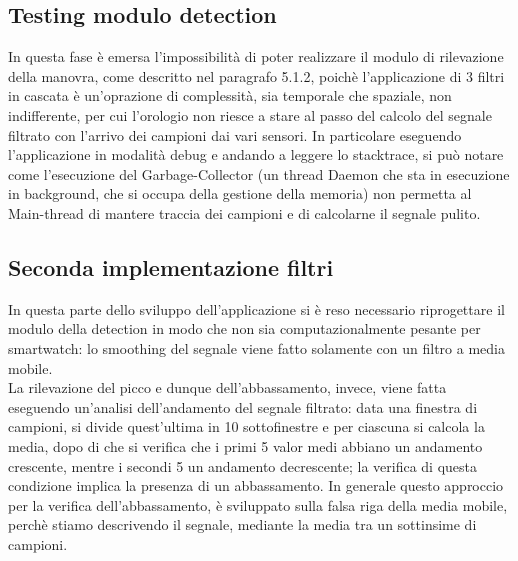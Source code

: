 \documentclass[a4paper, oneside]{book}
\begin{document}
\subsection{Testing modulo detection}
In questa fase è emersa l'impossibilità di poter realizzare il modulo di rilevazione della manovra, come descritto nel paragrafo 5.1.2, poichè l'applicazione di 3 filtri in cascata è un'oprazione di complessità, sia temporale che spaziale, non indifferente, per cui l'orologio non riesce a stare al passo del calcolo del segnale filtrato con l'arrivo dei campioni dai vari sensori. In particolare eseguendo l'applicazione in modalità debug e andando a leggere lo stacktrace, si può notare come l'esecuzione del Garbage-Collector (un thread Daemon che sta in esecuzione in background, che si occupa della gestione della memoria) non permetta al Main-thread di mantere traccia dei campioni e di calcolarne il segnale pulito.

\subsection{Seconda implementazione filtri}
In questa parte dello sviluppo dell'applicazione si è reso necessario riprogettare il modulo della detection in modo che non sia computazionalmente pesante per smartwatch: lo smoothing del segnale viene fatto solamente con un filtro a media mobile. \\
La rilevazione del picco e dunque dell'abbassamento, invece, viene fatta eseguendo un'analisi dell'andamento del segnale filtrato: data una finestra di campioni, si divide quest'ultima in 10 sottofinestre e per ciascuna si calcola la media, dopo di che si verifica che i primi 5 valor medi abbiano un andamento crescente, mentre i secondi 5 un andamento decrescente; la verifica di questa condizione implica la presenza di un abbassamento. In generale questo approccio per la verifica dell'abbassamento, è sviluppato sulla falsa riga della media mobile, perchè stiamo descrivendo il segnale, mediante la media tra un sottinsime di campioni.
\vspace{2mm}

\vspace{3mm}

\end{document}

